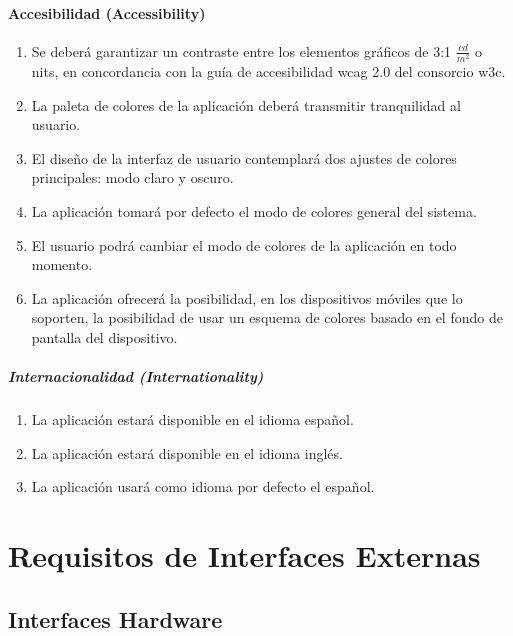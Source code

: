             \paragraph{Accesibilidad (Accessibility)}
                \begin{enumerate}[resume, label=\textbf{\texttt{RNF-\arabic*}}]
                    \item Se deberá garantizar un contraste entre los elementos gráficos de 3:1 $\frac{cd}{m^{2}}$ o nits, en concordancia con la guía de accesibilidad \gls{wcag} 2.0 del consorcio \gls{w3c}\cite{w3c_web_2008}.
                    \item La paleta de colores de la aplicación deberá transmitir tranquilidad al usuario.
                    \item El diseño de la interfaz de usuario contemplará dos ajustes de colores principales: modo claro y oscuro.
                    \item La aplicación tomará por defecto el modo de colores general del sistema.
                    \item El usuario podrá cambiar el modo de colores de la aplicación en todo momento. 
                    \item La aplicación ofrecerá la posibilidad, en los dispositivos móviles que lo soporten, la posibilidad de usar un esquema de colores basado en el fondo de pantalla del dispositivo.
                \end{enumerate}
                
                \subparagraph{Internacionalidad (Internationality)}
                    \begin{enumerate}[resume, label=\textbf{\texttt{RNF-\arabic*}}]
                        \item La aplicación estará disponible en el idioma español.
                        \item La aplicación estará disponible en el idioma inglés.
                        \item La aplicación usará como idioma por defecto el español.
                    \end{enumerate}
\section{Requisitos de Interfaces Externas}
    \label{req:externas}

    \subsection{Interfaces Hardware}
        \label{req:externas:hardware}

